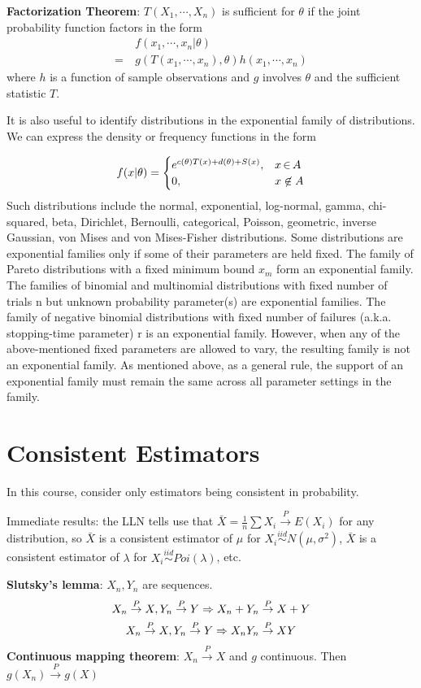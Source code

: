\documentclass[letterpaper, 8pt]{extarticle}
\begin{document}
\begin{multicols*}{3}
	\textbf{Factorization Theorem}: $T(X_1,\cdots,X_n)$ is sufficient for $\theta$ if the joint probability function factors in the form
	\begin{align*}
		&f(x_1,\cdots,x_n|\theta) \\
		=\ &g(T(x_1,\cdots,x_n),\theta)h(x_1,\cdots,x_n)
	\end{align*}
	where $h$ is a function of sample observations and $g$ involves $\theta$ and the sufficient statistic $T$.
	
	It is also useful to identify distributions in the exponential family of distributions. We can express the density or frequency functions in the form
	
	\[f(x|\theta)=\begin{cases}
	e^{c(\theta)T(x)+d(\theta)+S(x)}, & x\,{\in}\, A\\
	0, & x\not\in A
	\end{cases}\]
	Such distributions include the  normal, exponential, log-normal, gamma, chi-squared, beta, Dirichlet, Bernoulli, categorical, Poisson, geometric, inverse Gaussian, von Mises and von Mises-Fisher distributions. Some distributions are exponential families only if some of their parameters are held fixed. {\tiny The family of Pareto distributions with a fixed minimum bound $x_m$ form an exponential family. The families of binomial and multinomial distributions with fixed number of trials n but unknown probability parameter(s) are exponential families. The family of negative binomial distributions with fixed number of failures (a.k.a. stopping-time parameter) r is an exponential family. However, when any of the above-mentioned fixed parameters are allowed to vary, the resulting family is not an exponential family.} As mentioned above, as a general rule, the support of an exponential family must remain the same across all parameter settings in the family.
	
	\section{Consistent Estimators}
	In this course, consider only estimators being consistent in probability. 
	
	Immediate results: the LLN tells use that $\bar X=\frac{1}{n}\sum X_i\overset{P}{\to}E(X_i)$ for any distribution, so $\bar X$ is a consistent estimator of $\mu$ for $X_i\overset{iid}{\sim}N(\mu,\sigma^2)$, $\bar X$ is a consistent estimator of $\lambda$ for $X_i\overset{iid}{\sim}Poi(\lambda)$, etc.
	
	\textbf{Slutsky's lemma}: $X_n, Y_n$ are sequences.
	\begin{gather*}
		X_n\overset{P}{\to}X, Y_n\overset{P}{\to}Y\Rightarrow X_n+Y_n\overset{P}{\to}X+Y \\
		X_n\overset{P}{\to}X, Y_n\overset{P}{\to}Y\Rightarrow X_nY_n\overset{P}{\to}XY
	\end{gather*}
	\textbf{Continuous mapping theorem}: $X_n\overset{P}{\to}X$ and $g$ continuous. Then $g(X_n)\overset{P}{\to}g(X)$
	

\end{multicols*}
\end{document}
